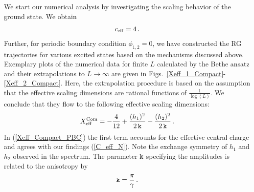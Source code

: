 \documentclass[12pt]{article}
\numberwithin{equation}{section}
\newcommand{\kk}{{\tt k}}
\begin{document}
	We start our numerical analysis by investigating the scaling behavior of the ground state. We obtain
	\begin{align}
		c_{\rm{eff}}=4\,.\label{C_eff_N}
	\end{align}
	Further, for periodic boundary condition $\phi_{1,2}=0$, we have constructed the RG trajectories for various excited states based on the mechanisms discussed above.  Exemplary plots of the numerical data for finite $L$ calculated by the Bethe ansatz and their extrapolations to $L\to \infty$ are given in Figs.~\ref{Xeff_1_Compact}-\ref{Xeff_2_Compact}. Here, the extrapolation procedure is based on the assumption that the effective scaling dimensions are rational functions of $\frac{1}{\log(L)}$.  We conclude that they flow to the following effective scaling dimensions:
	\begin{align}
		X^{\rm{Com}}_{\mathrm{eff}}=-\frac{4}{12}+\frac{(h_1     )^2}{2 \,\kk}
		+\frac{( h_2 )^2}{2 \,\kk} \,.\label{Xeff_Compact_PBC}
	\end{align}
	In (\ref{Xeff_Compact_PBC}) the first term accounts for the effective central charge and agrees with our findings (\ref{C_eff_N}).  Note the exchange symmetry of $h_1 $ and $h_2$ observed in the spectrum. The parameter $\kk$ specifying the amplitudes is related to the anisotropy by 
	\begin{align}
		\kk=\frac{\pi}{\gamma}\,.
	\end{align}
	
	
	
\end{document}
